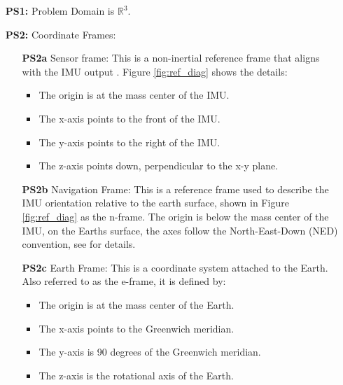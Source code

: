 \documentclass[12pt]{article}
\begin{document}
\begin{itemize}
  \item[\textbf{PS1:}] Problem Domain is $\mathbb{R}^3$.

  \item[\textbf{PS2:}] Coordinate Frames:
  \begin{itemize}
      \item[\textbf{PS2a}] Sensor frame: This is a non-inertial reference frame that aligns with the
      IMU output \cite{al-jlailaty_efficient_2020}. Figure \ref{fig:ref_diag} shows the details:
        \begin{itemize}
            \item The origin is at the mass center of the IMU.
            \item The x-axis points to the front of the IMU.
            \item The y-axis points to the right of the IMU.
            \item The z-axis points down, perpendicular to the x-y plane.
        \end{itemize}
    \item[\textbf{PS2b}] Navigation Frame: This is a reference frame used to describe the IMU
    orientation relative to the earth surface, shown in Figure \ref{fig:ref_diag} as the n-frame.
    The origin is below the mass center of the IMU, on the Earths surface, the axes follow the
    North-East-Down (NED) convention, see \cite{ned} for details.

    \item[\textbf{PS2c}] Earth Frame: This is a coordinate system attached to the Earth. Also
    referred to as the e-frame, it is defined by:
    \begin{itemize}
        \item The origin is at the mass center of the Earth.
        \item The x-axis points to the Greenwich meridian.
        \item The y-axis is 90 degrees of the Greenwich meridian.
        \item The z-axis is the rotational axis of the Earth.
        \end{itemize}
  \end{itemize}
  

\end{itemize}
\end{document}
